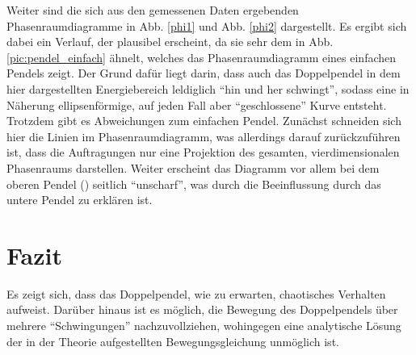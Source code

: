 Weiter sind die sich aus den gemessenen Daten ergebenden Phasenraumdiagramme in Abb. \ref{phi1} und Abb. \ref{phi2} dargestellt. Es ergibt sich dabei ein Verlauf, der plausibel erscheint, da sie sehr dem in Abb. \ref{pic:pendel_einfach} ähnelt, welches das Phasenraumdiagramm eines einfachen Pendels zeigt. Der Grund dafür liegt darin, dass auch das Doppelpendel in dem hier dargestellten Energiebereich leldiglich \enquote{hin und her schwingt}, sodass eine in Näherung ellipsenförmige, auf jeden Fall aber \enquote{geschlossene} Kurve entsteht. \\
Trotzdem gibt es Abweichungen zum einfachen Pendel. Zunächst schneiden sich hier die Linien im Phasenraumdiagramm, was allerdings darauf zurückzuführen ist, dass die Auftragungen nur eine Projektion des gesamten, vierdimensionalen Phasenraums darstellen. Weiter erscheint das Diagramm vor allem bei dem oberen Pendel () seitlich \enquote{unscharf}, was durch die Beeinflussung durch das untere Pendel zu erklären ist. 

\section{Fazit}
Es zeigt sich, dass das Doppelpendel, wie zu erwarten, chaotisches Verhalten aufweist. Darüber hinaus ist es möglich, die Bewegung des Doppelpendels über mehrere \enquote{Schwingungen} nachzuvollziehen, wohingegen eine analytische Lösung der in der Theorie aufgestellten Bewegungsgleichung unmöglich ist. 

